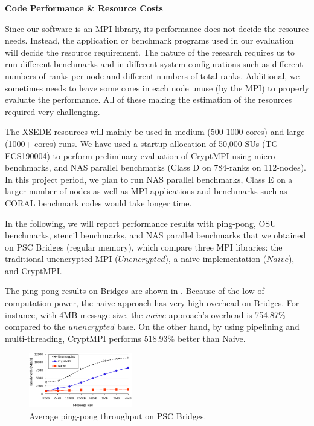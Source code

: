 \centerline{\Large\bfseries Code Performance \& Resource Costs}

Since our software is an MPI library, its performance does not decide the resource needs.
Instead, the application or benchmark programs used in our evaluation will decide the resource
requirement. The nature of the research requires us to run different benchmarks and in different
system configurations such as different numbers of ranks per node and different numbers of total
ranks. Additional, we sometimes needs to leave some cores in each node unuse (by the MPI) to
properly evaluate the performance. All of these making the estimation of the resources required
very challenging.

The XSEDE resources will mainly be used in medium (500-1000 cores) and large
(1000+ cores) runs. We have used a startup allocation of 50,000 SUs (TG-ECS190004) to perform
preliminary evaluation of CryptMPI using micro-benchmarks, and
NAS parallel benchmarks (Class D on 784-ranks on 112-nodes). In this project period, we plan to
run NAS parallel benchmarks, Class E on a larger number of nodes as well as MPI applications
and benchmarks such as CORAL benchmark codes would take longer time. 

In the following, we will report performance results with ping-pong, OSU benchmarks, stencil
benchmarks, and NAS parallel benchmarks that we obtained on
PSC Bridges (regular memory), which compare three MPI libraries: the traditional unencrypted
MPI ($Unencrypted$), a naive implementation ($Naive$), and CryptMPI. 

The ping-pong results on Bridges are shown in . Because of
the low of computation power, the naive approach has very high overhead on Bridges.
For instance, with 4MB message size,
the $naive$ approach's overhead is 754.87\% compared to the $unencrypted$
base. On the other hand, by using pipelining and multi-threading, CryptMPI performs
518.93\% better than Naive.

\begin{figure}[htb]
	\centering
		\includegraphics[width=0.4\textwidth]{graphs/infini-xsede-pingpong.eps}
	\caption{Average %
	ping-pong throughput on PSC Bridges.}
	\label{fig:xsede_pingpong}
	\vspace{-2ex}
\end{figure}

